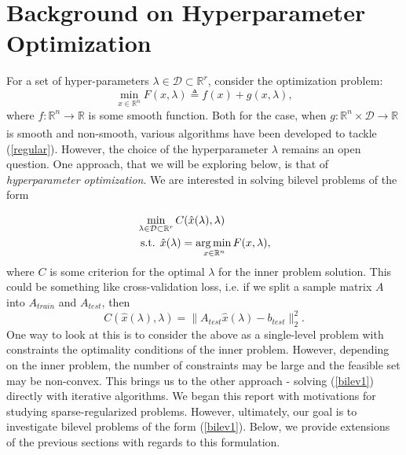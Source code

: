 \documentclass[11pt, twoside]{report}
\begin{document}
\chapter{Background on Hyperparameter Optimization}
For a set of hyper-parameters $\lambda \in \mathcal{D} \subset \mathbb{R}^r$, consider the optimization problem:
\begin{equation} \label{regular}
    \min _{x \in \mathbb{R}^n} F(x,\lambda) \triangleq f(x) + g(x,\lambda),
\end{equation}
where $f: \mathbb{R}^n \xrightarrow[]{} \mathbb{R}$ is some smooth function. Both for the case, when $g: \mathbb{R}^n \times \mathcal{D} \xrightarrow[]{} \mathbb{R}$ is smooth and non-smooth, various algorithms have been developed to tackle (\ref{regular}). However, the choice of the hyperparameter $\lambda$ remains an open question. One approach, that we will be exploring below, is that of \textit{hyperparameter optimization}. We are interested in solving bilevel problems of the form

\begin{align} 
&\min _{\lambda \in \mathcal{D} \subset \mathbb{R}^r} C(\hat{x}(\lambda), \lambda) \label{bilev1}\\
&\text { s.t. } \hat{x}(\lambda) =\underset{x \in \mathbb{R}^{n}} {\operatorname*{arg\, min \,}} {F(x, \lambda)} \label{inprob},
\end{align}
where $C$ is some criterion for the optimal $\lambda$ for the inner problem solution. This could be something like cross-validation loss, i.e. if we split a sample matrix $A$ into $A_{train}$ and $A_{test}$, then
\[C(\hat{x}(\lambda),\lambda) = \|A_{test} \hat{x}(\lambda) - b_{test}\|_2^2.\]
One way to look at this is to consider the above as a single-level problem with constraints the optimality conditions of the inner problem. However, depending on the inner problem, the number of constraints may be large and the feasible set may be non-convex. %
This brings us to the other approach - solving (\ref{bilev1}) directly with iterative algorithms. We began this report with motivations for studying sparse-regularized problems. However, ultimately, our goal is to investigate bilevel problems of the form (\ref{bilev1}). Below, we provide extensions of the previous sections with regards to this formulation.
\end{document}
